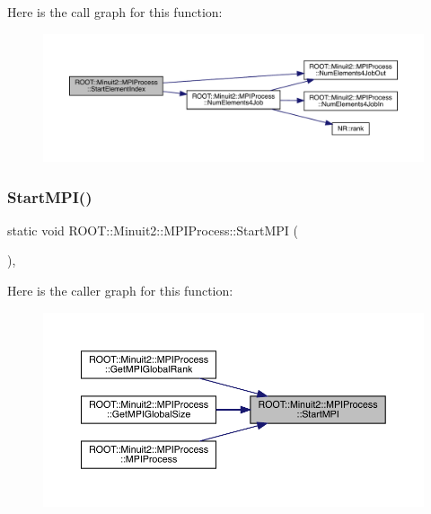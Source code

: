 Here is the call graph for this function\+:
\nopagebreak
\begin{figure}[H]
\begin{center}
\leavevmode
\includegraphics[width=350pt]{dc/d43/classROOT_1_1Minuit2_1_1MPIProcess_a9e6b2dc6f57cc91bb11637b50ba15957_cgraph}
\end{center}
\end{figure}
\mbox{\label{classROOT_1_1Minuit2_1_1MPIProcess_a235146d3dbd688de458e09425e546d96}} 
\subsubsection{\texorpdfstring{StartMPI()}{StartMPI()}\hspace{0.1cm}{\footnotesize\ttfamily [1/2]}}
{\footnotesize\ttfamily static void R\+O\+O\+T\+::\+Minuit2\+::\+M\+P\+I\+Process\+::\+Start\+M\+PI (\begin{DoxyParamCaption}{ }\end{DoxyParamCaption})\hspace{0.3cm}{\ttfamily [inline]}, {\ttfamily [static]}}

Here is the caller graph for this function\+:\nopagebreak
\begin{figure}[H]
\begin{center}
\leavevmode
\includegraphics[width=350pt]{dc/d43/classROOT_1_1Minuit2_1_1MPIProcess_a235146d3dbd688de458e09425e546d96_icgraph}
\end{center}
\end{figure}
\mbox{\label{classROOT_1_1Minuit2_1_1MPIProcess_a235146d3dbd688de458e09425e546d96}} 
